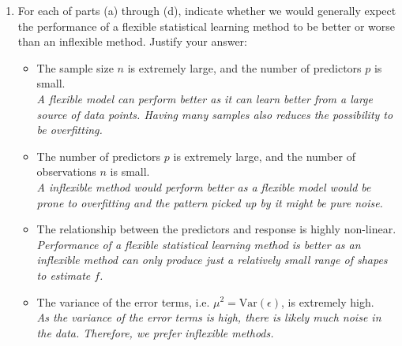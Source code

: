 \documentclass[12pt]{article}
\begin{document}
\begin{enumerate}
    \item For each of parts (a) through (d), indicate whether we would generally expect the performance of a flexible statistical learning method to be better or worse than an inflexible method. Justify your answer:

\begin{itemize}
    \item The sample size $n$ is extremely large, and the number of predictors $p$ is small. \\\textit{A flexible model can perform better as it can learn better from a large source of data points. Having many samples also reduces the possibility to be overfitting.}
    \item The number of predictors $p$ is extremely large, and the number of observations $n$ is small. \\\textit{A inflexible method would perform better as a flexible model would be prone to overfitting and the pattern picked up by it might be pure noise.}
    \item The relationship between the predictors and response is highly non-linear. \\\textit{Performance of a flexible statistical learning method is better as an inflexible method can only produce just a relatively small range of shapes to estimate $f$.}
    \item The variance of the error terms, i.e. $\mu^2 = \text{Var}(\epsilon)$, is extremely high.
    \\\textit{As the variance of the error terms is high, there is likely much noise in the data. Therefore, we prefer inflexible methods.}
\end{itemize}


\end{enumerate}
\end{document}
